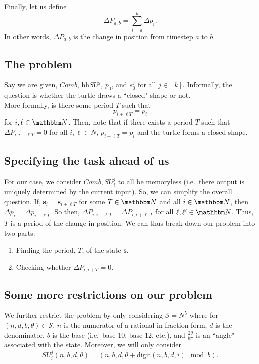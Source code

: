 \documentclass[11pt,titlepage]{article}
\begin{document}
Finally, let us define
$$
  \Delta P_{a, b} = \sum_{i = a}^{b} \Delta p_i.
$$
In other words, $\Delta P_{a, b}$ is the change in position from timestep $a$ to $b$.

\subsection{The problem}
Say we are given, $Comb$, hh$SU^j$, $p_0$, and $s^j_0$ for all $j \in [k]$.
Informally, the question is whether the turtle draws a ``closed" shape or not.\\
More formally, is there some period $T$ such that 
$$
  p_{i + \ell T} = p_{i}
$$
for $i, \ell \in \N$.
Then, note that if there exists a period $T$ such that 
$\Delta P_{i, i + \ell T} = 0$ for all $i, \ell \in N$, 
$p_{i + \ell T} = p_{i}$ and the turtle forms a closed shape.


\subsection{Specifying the task ahead of us}
For our case, we consider $Comb, SU_i^j$ to all be memoryless (i.e.\ there output
is uniquely determined by the current input). So, we can simplify the overall question.
If, $\pmb{s}_i = \pmb{s}_{i + \ell T}$ for some $T \in \N$ and all $i \in \N$, then 
$\Delta p_{i} = \Delta p_{i + \ell T}$. So then,
$\Delta P_{i, i + \ell T} = \Delta P_{i, i + \ell' T}$ for all $\ell, \ell' \in \N$.
Thus, $T$ is a period of the change in position. We can thus
break down our problem into two parts:
\begin{enumerate}
  \item Finding the period, $T$, of the state $\pmb{s}$.
  \item Checking whether $\Delta P_{i, i + T} = 0$.
\end{enumerate}

\subsection{Some more restrictions on our problem}
We further restrict the problem by only considering $\mathcal{S} = N^5$ where for $(n, d, b, \theta) \in \mathcal{S}$,
$n$ is the numerator of a rational in fraction form, $d$ is the denominator, 
$b$ is the base (i.e.\ base 10, base 12, etc.),
and $\frac{2\theta}{b \pi}$ is an ``angle" associated with the state.
Moreover, we will only consider
$$
  SU_i^j(n, b, d, \theta) = (n, b, d, \theta + \mathrm{digit}(n, b, d, i) \mod b).
$$
\end{document}
